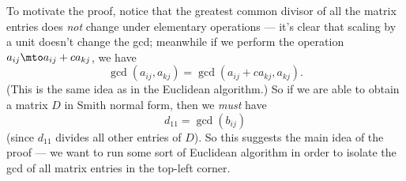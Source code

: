 
To motivate the proof, notice that the greatest common divisor of all the matrix entries does \emph{not} change under elementary operations --- it's clear that scaling by a unit doesn't change the gcd; meanwhile if we perform the operation $a_{ij} \mto a_{ij} + ca_{kj}$, we have \[\gcd(a_{ij}, a_{kj}) = \gcd(a_{ij} + ca_{kj}, a_{kj}).\] (This is the same idea as in the Euclidean algorithm.) So if we are able to obtain a matrix $D$ in Smith normal form, then we \emph{must} have \[d_{11} = \gcd(b_{ij})\] (since $d_{11}$ divides all other entries of $D$). So this suggests the main idea of the proof --- we want to run some sort of Euclidean algorithm in order to isolate the gcd of all matrix entries in the top-left corner. 





